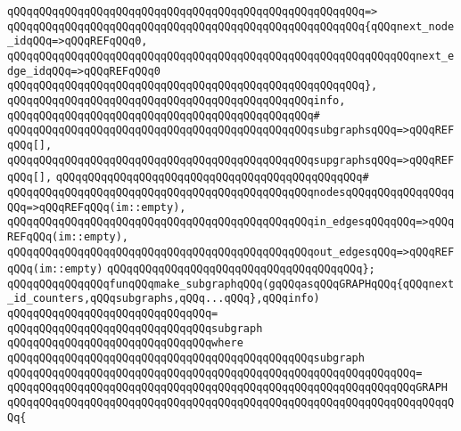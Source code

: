 \verb|qQQqqQQqqQQqqQQqqQQqqQQqqQQqqQQqqQQqqQQqqQQqqQQqqQQqqQQq=>|\newline
\verb|qQQqqQQqqQQqqQQqqQQqqQQqqQQqqQQqqQQqqQQqqQQqqQQqqQQqqQQq{qQQqnext_node_idqQQq=>qQQqREFqQQq0,|\newline
\verb|qQQqqQQqqQQqqQQqqQQqqQQqqQQqqQQqqQQqqQQqqQQqqQQqqQQqqQQqqQQqqQQqnext_edge_idqQQq=>qQQqREFqQQq0|\newline
\verb|qQQqqQQqqQQqqQQqqQQqqQQqqQQqqQQqqQQqqQQqqQQqqQQqqQQqqQQq},|\newline
\newline
\verb|qQQqqQQqqQQqqQQqqQQqqQQqqQQqqQQqqQQqqQQqqQQqqQQqinfo,|\newline
\verb|qQQqqQQqqQQqqQQqqQQqqQQqqQQqqQQqqQQqqQQqqQQqqQQq#|\newline
\verb|qQQqqQQqqQQqqQQqqQQqqQQqqQQqqQQqqQQqqQQqqQQqqQQqsubgraphsqQQq=>qQQqREFqQQq[],|\newline
\verb|qQQqqQQqqQQqqQQqqQQqqQQqqQQqqQQqqQQqqQQqqQQqqQQqsupgraphsqQQq=>qQQqREFqQQq[],|\newline
\verb|qQQqqQQqqQQqqQQqqQQqqQQqqQQqqQQqqQQqqQQqqQQqqQQq#|\newline
\verb|qQQqqQQqqQQqqQQqqQQqqQQqqQQqqQQqqQQqqQQqqQQqqQQqnodesqQQqqQQqqQQqqQQqqQQq=>qQQqREFqQQq(im::empty),|\newline
\verb|qQQqqQQqqQQqqQQqqQQqqQQqqQQqqQQqqQQqqQQqqQQqqQQqin_edgesqQQqqQQq=>qQQqREFqQQq(im::empty),|\newline
\verb|qQQqqQQqqQQqqQQqqQQqqQQqqQQqqQQqqQQqqQQqqQQqqQQqout_edgesqQQq=>qQQqREFqQQq(im::empty)|\newline
\verb|qQQqqQQqqQQqqQQqqQQqqQQqqQQqqQQqqQQqqQQq};|\newline
\newline
\verb|qQQqqQQqqQQqqQQqfunqQQqmake_subgraphqQQq(gqQQqasqQQqGRAPHqQQq{qQQqnext_id_counters,qQQqsubgraphs,qQQq...qQQq},qQQqinfo)|\newline
\verb|qQQqqQQqqQQqqQQqqQQqqQQqqQQqqQQq=|\newline
\verb|qQQqqQQqqQQqqQQqqQQqqQQqqQQqqQQqsubgraph|\newline
\verb|qQQqqQQqqQQqqQQqqQQqqQQqqQQqqQQqwhere|\newline
\verb|qQQqqQQqqQQqqQQqqQQqqQQqqQQqqQQqqQQqqQQqqQQqqQQqsubgraph|\newline
\verb|qQQqqQQqqQQqqQQqqQQqqQQqqQQqqQQqqQQqqQQqqQQqqQQqqQQqqQQqqQQqqQQq=|\newline
\verb|qQQqqQQqqQQqqQQqqQQqqQQqqQQqqQQqqQQqqQQqqQQqqQQqqQQqqQQqqQQqqQQqGRAPH|\newline
\verb|qQQqqQQqqQQqqQQqqQQqqQQqqQQqqQQqqQQqqQQqqQQqqQQqqQQqqQQqqQQqqQQqqQQqqQQq{|\newline
